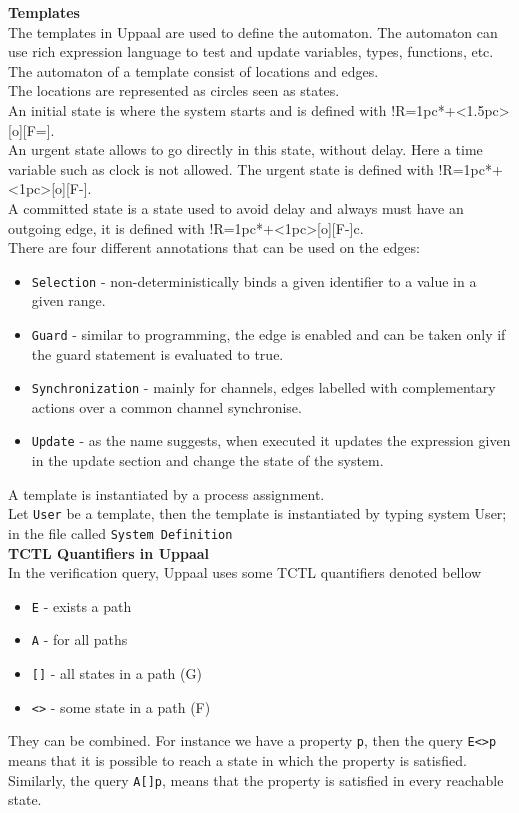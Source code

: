 \documentclass[a4paper, twocolumn]{article}
\begin{document}
\noindent\textbf{Templates}\\
The templates in Uppaal are used to define the automaton. The automaton can use rich expression language to test and update variables, types, functions, etc. The automaton of a template consist of locations and edges.\\
The locations are represented as circles seen as states.\\
An initial state is where the system starts and is defined with \xymatrix@ur@!R=1pc{*+<1.5pc>[o][F=]{}}.\\
An urgent state allows to go directly in this state, without delay. Here a time variable such as clock \cite{tutoUppaal} is not allowed. The urgent state is defined with \xymatrix@ur@!R=1pc{*+<1pc>[o][F-]{\cup}}.\\
A committed state is a state used to avoid delay and always must have an outgoing edge, it is defined with \xymatrix@ur@!R=1pc{*+<1pc>[o][F-]{c}}.\\
There are four different annotations that can be used on the edges:
\begin{itemize}
    \item \texttt{Selection} - non-deterministically binds a given identifier to a value in a given range.
    \item \texttt{Guard} - similar to programming, the edge is enabled and can be taken only if the guard statement is evaluated to true.
    \item \texttt{Synchronization} - mainly for channels, edges labelled with complementary actions over a common channel synchronise.
    \item \texttt{Update} - as the name suggests, when executed it updates the expression given in the update section and change the state of the system.
\end{itemize}
A template is instantiated by a process assignment.\\
Let \texttt{User} be a template, then the template is instantiated by typing \colorbox{backcolour}{system User;} in the file called \texttt{System Definition}\\

\noindent \textbf{TCTL Quantifiers in Uppaal}\\
In the verification query, Uppaal uses some TCTL quantifiers denoted bellow
\begin{itemize}
    \item \texttt{E} - exists a path
    \item \texttt{A} - for all paths
    \item \texttt{[]} - all states in a path (G)
    \item \texttt{<>} - some state in a path (F)
\end{itemize}
They can be combined. For instance we have a property \texttt{p}, then the query \texttt{E<>p} means that it is possible to reach a state in which the property is satisfied. Similarly, the query \texttt{A[]p}, means that the property is satisfied in every reachable state.\\
\end{document}
